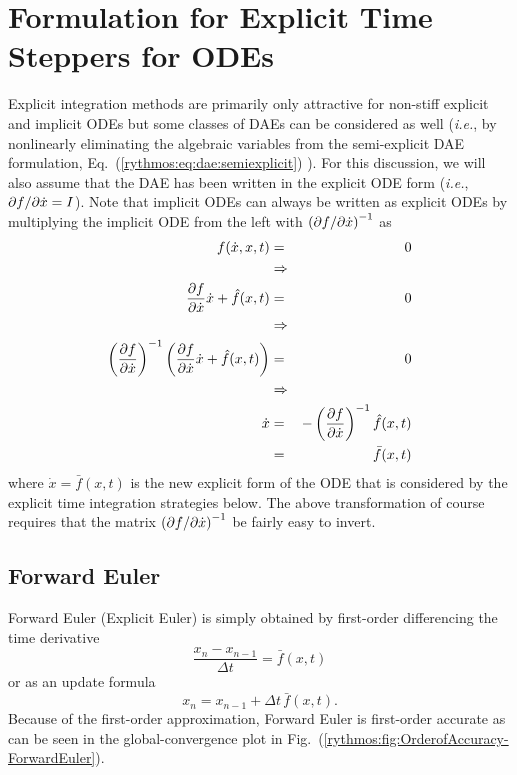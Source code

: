 \cleardoublepage{}

\section{Formulation for Explicit Time Steppers for ODEs}

Explicit integration methods are primarily only attractive for non-stiff
explicit and implicit ODEs but some classes of DAEs can be considered
as well (\emph{i.e.}, by nonlinearly eliminating the algebraic variables
from the semi-explicit DAE formulation, Eq.~(\ref{rythmos:eq:dae:semiexplicit})
\cite{BCP}). For this discussion, we will also assume that the DAE
has been written in the explicit ODE form (\emph{i.e.}, $\partial f / \partial \dot{x}=I$).
Note that implicit ODEs can always be written as explicit ODEs by
multiplying the implicit ODE from the left with $\left(\partial f / \partial \dot{x}\right)^{-1}$
as
\begin{eqnarray*}
f(\dot{x},x,t) & = & 0\\
 & \Rightarrow\\
\displaystyle{\frac{\partial f}{\partial \dot{x}}}\dot{x}+\hat{f}(x,t) & = & 0\\
 & \Rightarrow\\
\left(\displaystyle{\frac{\partial f}{\partial \dot{x}}}\right)^{-1}\left(\displaystyle{\frac{\partial f}{\partial \dot{x}}}\dot{x}+\hat{f}(x,t)\right) & = & 0\\
 & \Rightarrow\\
\dot{x} & = & -\left(\displaystyle{\frac{\partial f}{\partial \dot{x}}}\right)^{-1}\hat{f}(x,t)\\
 & = & \bar{f}(x,t)
\end{eqnarray*}
where $\dot{x}=\bar{f}(x,t)$ is the new explicit form of the ODE
that is considered by the explicit time integration strategies below.
The above transformation of course requires that the matrix $\left(\partial f / \partial \dot{x}\right)^{-1}$
be fairly easy to invert.

\subsection{Forward Euler\label{rythmos:sec:Forward-Euler}}

Forward Euler (Explicit Euler) is simply obtained by first-order differencing
the time derivative
\[
\frac{x_{n}-x_{n-1}}{\Delta t}=\bar{f}(x,t)
\]
or as an update formula
\[
x_{n}=x_{n-1}+\Delta t\,\bar{f}(x,t).
\]
Because of the first-order approximation, Forward Euler is first-order
accurate as can be seen in the global-convergence plot in Fig.~(\ref{rythmos:fig:OrderofAccuracy-ForwardEuler}).

